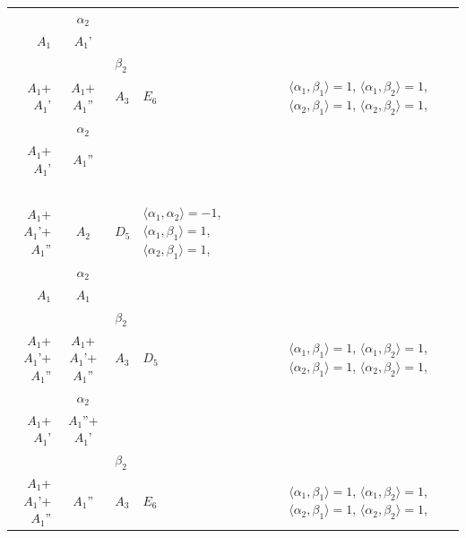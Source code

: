 \documentclass[12pt]{report}
\begin{document}
\begin{appendix}
{\begin{longtable}{rcl p{1cm}p{1cm}p{3cm} }
\\
\begin{tabular}{cc}$\alpha_1$+ & $\alpha_2$\\\tiny{ $A_1$ } & \tiny{ $A_1$' }\end{tabular} &\begin{tabular}{c} = \\~ \end{tabular} & \begin{tabular}{cc}$\beta_1$+ & $\beta_2$\\\tiny{ $A_1$+$A_1$' } & \tiny{ $A_1$+$A_1$'' }\end{tabular} & $A_3$ & $E_6$ &  $\langle\alpha_1, \beta_1\rangle=1$, $\langle\alpha_1, \beta_2\rangle=1$, $\langle\alpha_2, \beta_1\rangle=1$, $\langle\alpha_2, \beta_2\rangle=1$, 
\\
\begin{tabular}{cc}$\alpha_1$+ & $\alpha_2$\\\tiny{ $A_1$+$A_1$' } & \tiny{ $A_1$'' }\end{tabular} &\begin{tabular}{c} = \\~ \end{tabular} & \begin{tabular}{c}$\beta_1$\\\tiny{ $A_1$+$A_1$'+$A_1$'' }\end{tabular} & $A_2$ & $D_5$ & $\langle\alpha_1, \alpha_2\rangle=-1$,  $\langle\alpha_1, \beta_1\rangle=1$, $\langle\alpha_2, \beta_1\rangle=1$, 
\\
\begin{tabular}{cc}$\alpha_1$+ & $\alpha_2$\\\tiny{ $A_1$ } & \tiny{ $A_1$ }\end{tabular} &\begin{tabular}{c} = \\~ \end{tabular} & \begin{tabular}{cc}$\beta_1$+ & $\beta_2$\\\tiny{ $A_1$+$A_1$'+$A_1$'' } & \tiny{ $A_1$+$A_1$'+$A_1$'' }\end{tabular} & $A_3$ & $D_5$ &  $\langle\alpha_1, \beta_1\rangle=1$, $\langle\alpha_1, \beta_2\rangle=1$, $\langle\alpha_2, \beta_1\rangle=1$, $\langle\alpha_2, \beta_2\rangle=1$, 
\\
\begin{tabular}{cc}$\alpha_1$+ & $\alpha_2$\\\tiny{ $A_1$+$A_1$' } & \tiny{ $A_1$''+$A_1$' }\end{tabular} &\begin{tabular}{c} = \\~ \end{tabular} & \begin{tabular}{cc}$\beta_1$+ & $\beta_2$\\\tiny{ $A_1$+$A_1$'+$A_1$'' } & \tiny{ $A_1$'' }\end{tabular} & $A_3$ & $E_6$ &  $\langle\alpha_1, \beta_1\rangle=1$, $\langle\alpha_1, \beta_2\rangle=1$, $\langle\alpha_2, \beta_1\rangle=1$, $\langle\alpha_2, \beta_2\rangle=1$, 

\end{longtable}}
\end{appendix}
\end{document}
